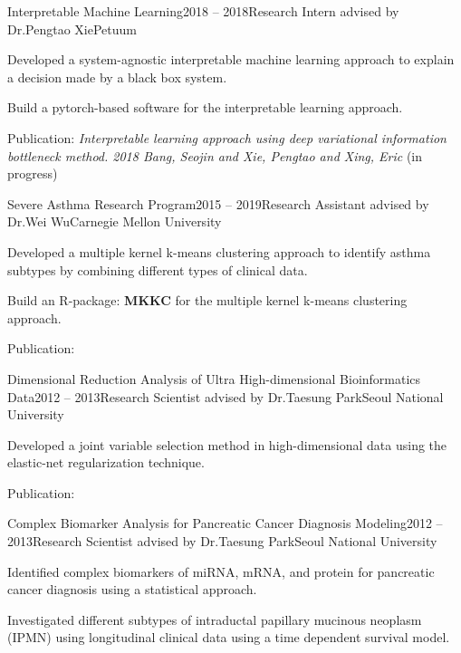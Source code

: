 \documentclass{tidycv} %
\begin{document}
\begin{cvresearches}
\begin{cvresearch}{Interpretable Machine Learning}{2018 -- 2018}{Research Intern advised by Dr.\@ Pengtao Xie}{Petuum}
 \item Developed a system-agnostic interpretable machine learning approach to explain a decision made by a black box system.
 \item Build a pytorch-based software for the interpretable learning approach.
 \item Publication: \textit{Interpretable learning approach using deep variational information bottleneck method. 2018 Bang, Seojin and Xie, Pengtao and Xing, Eric} (in progress)
\end{cvresearch}
\begin{cvresearch}{Severe Asthma Research Program}{2015 -- 2019}{Research Assistant advised by Dr.\@ Wei Wu}{Carnegie Mellon University}
 \item Developed a multiple kernel k-means clustering approach to identify asthma subtypes by combining different types of clinical data.
 \item Build an R-package: {\bf MKKC} for the multiple kernel k-means clustering approach.
 \item Publication: \cite{wu2018asthma, bang2016naive}
\end{cvresearch}
\begin{cvresearch}{Dimensional Reduction Analysis of Ultra High-dimensional Bioinformatics Data}{2012 -- 2013}{Research Scientist advised by Dr.\@ Taesung Park}{Seoul National University}
 \item Developed a joint variable selection method in high-dimensional data using the elastic-net regularization technique.
 \item Publication: \cite{bang2012joint}
\end{cvresearch}
\begin{cvresearch}{Complex Biomarker Analysis for Pancreatic Cancer Diagnosis Modeling}{2012 -- 2013}{Research Scientist advised by Dr.\@ Taesung Park}{Seoul National University}
\item Identified complex biomarkers of miRNA, mRNA, and protein for pancreatic cancer diagnosis using a statistical approach.
\item Investigated different subtypes of intraductal papillary mucinous neoplasm (IPMN) using longitudinal clinical data using a time dependent survival model.

\end{cvresearch}
\end{cvresearches}
\end{document}
